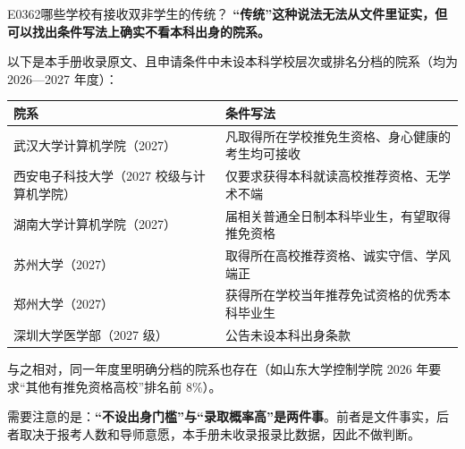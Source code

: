 \begin{qa}{E0362}{哪些学校有接收双非学生的传统？}
\textbf{“传统”这种说法无法从文件里证实，但可以找出条件写法上确实不看本科出身的院系。}

以下是本手册收录原文、且申请条件中未设本科学校层次或排名分档的院系（均为 2026—2027 年度）：

\par\vspace{2pt}\nobreak\begin{center}\footnotesize
\begin{tabularx}{\textwidth}{>{\raggedright\arraybackslash}X>{\raggedright\arraybackslash}X}
\toprule
\textbf{院系} & \textbf{条件写法} \\ \midrule
武汉大学计算机学院（2027） & 凡取得所在学校推免生资格、身心健康的考生均可接收 \\
西安电子科技大学（2027 校级与计算机学院） & 仅要求获得本科就读高校推荐资格、无学术不端 \\
湖南大学计算机学院（2027） & 2027 届相关普通全日制本科毕业生，有望取得推免资格 \\
苏州大学（2027） & 取得所在高校推荐资格、诚实守信、学风端正 \\
郑州大学（2027） & 获得所在学校当年推荐免试资格的优秀本科毕业生 \\
深圳大学医学部（2027 级） & 公告未设本科出身条款 \\
\bottomrule
\end{tabularx}
\end{center}\vspace{2pt}\par

与之相对，同一年度里明确分档的院系也存在（如山东大学控制学院 2026 年要求“其他有推免资格高校”排名前 8\%）。

需要注意的是：\textbf{“不设出身门槛”与“录取概率高”是两件事}。前者是文件事实，后者取决于报考人数和导师意愿，本手册未收录报录比数据，因此不做判断。
\end{qa}

